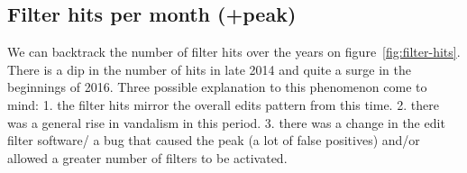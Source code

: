 \subsection{Filter hits per month (+peak)}
We can backtrack the number of filter hits over the years on figure~\ref{fig:filter-hits}.
There is a dip in the number of hits in late 2014 and quite a surge in the beginnings of 2016.
Three possible explanation to this phenomenon come to mind:
1. the filter hits mirror the overall edits pattern from this time.
2. there was a general rise in vandalism in this period.
3. there was a change in the edit filter software/ a bug that caused the peak (a lot of false positives) and/or allowed a greater number of filters to be activated.

